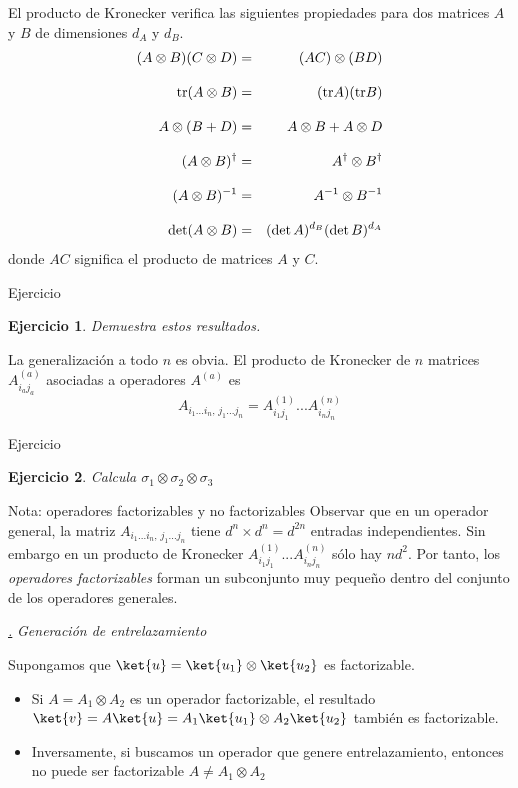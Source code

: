 \documentclass[a4paper,11pt]{book} %
\newtheorem{ejercicio_contador}{Ejercicio}
\newcommand{\Ejercicio}[1]{
		\begin{mybox_gray}{Ejercicio} 
			\begin{ejercicio_contador}
				 #1 
			\end{ejercicio_contador} 
		\end{mybox_gray}
	}
\numberwithin{equation}{chapter}
\def\subsubiContadorIt{\par\addtocounter{subsubsection}{1}\underline{\it\thesubsubsection.}\hskip0.5cm \setcounter{subsubsubsectionIt}{0}}
\newcommand{\SubsubiIt}[1]{
		\subsubiContadorIt \textit{#1}
	}
\newcounter{subsubsubsectionIt}[subsubsection]
\begin{document}
El producto de Kronecker verifica las siguientes propiedades para dos matrices $A$  y $B$ de dimensiones $d_A$ y $d_B$. 
\begin{eqnarray}
(A\otimes B)(C\otimes D) &=& (AC)\otimes (BD) \nonumber\\ \rule{0mm}{6mm}
{\rm tr}(A\otimes B) &=& ({\rm tr} A)({\rm tr} B) \nonumber\\ \rule{0mm}{6mm}
A\otimes(B+D) &=& A\otimes B + A\otimes D \nonumber\\ \rule{0mm}{6mm}
(A\otimes B)^\dagger &=& A^\dagger\otimes B^\dagger \nonumber\\ \rule{0mm}{6mm}
(A\otimes B)^{-1} &=& A^{-1} \otimes B^{-1} \nonumber\\ \rule{0mm}{6mm}
\det (A\otimes B) &=& (\det A)^{d_B}(\det B)^{d_A}
\end{eqnarray}
donde $AC$ significa el producto de matrices $A$ y $C$.

	\Ejercicio{
	Demuestra estos resultados.
	}

La generalización a todo $n$ es obvia. El producto de Kronecker de $n$ matrices $ A^{(a)}_{i_aj_a}$ asociadas a operadores $A^{(a)}$ es
	\begin{equation}
	 A_{i_1...i_n,\,j_1...j_n} = A^{(1)}_{i_1j_1}...A^{(n)}_{i_n j_n} 
	\end{equation}

	\Ejercicio{
	Calcula $\sigma_1\otimes \sigma_2\otimes \sigma_3$
	}

\begin{mybox_blue}{Nota: operadores factorizables y no factorizables}
Observar que en un operador general, la matriz $ A_{i_1...i_n,\,j_1...j_n}$ tiene $d^n\times d^n = d^{2n}$ entradas independientes. 
Sin embargo en un producto de Kronecker $A^{(1)}_{i_1j_1}...A^{(n)}_{i_n j_n}$ sólo hay $nd^2$.     
Por tanto, los \textit{operadores factorizables} forman un subconjunto muy pequeño dentro del conjunto de los operadores generales.
\end{mybox_blue}

			\SubsubiIt{Generación de entrelazamiento}


Supongamos que $\ket{u} = \ket{u_1}\otimes\ket{u_2}$ es factorizable. 
\begin{itemize}
	\item Si $A=A_1\otimes A_2$ es un operador factorizable, el resultado $\ket{v} = A\ket{u} = A_1\ket{u_1}\otimes A_2\ket{u_2}$ también es factorizable.
	\item Inversamente, si buscamos un operador que genere entrelazamiento, entonces no puede ser factorizable $A\neq A_1\otimes A_2$
\end{itemize}
\end{document}
